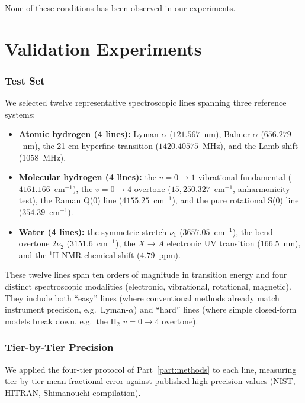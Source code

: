 \documentclass[11pt,a4paper]{article}
\theoremstyle{thmstyle}
\theoremstyle{axiomstyle}
\theoremstyle{definition}
\theoremstyle{remark}
\begin{document}
None of these conditions has been observed in our experiments.

\clearpage

\part{Validation Experiments}
\label{part:validation}

\section{Test Set}
\label{sec:testset}

We selected twelve representative spectroscopic lines spanning three reference systems:

\begin{itemize}[nosep]
\item \textbf{Atomic hydrogen (4 lines):} Lyman-$\alpha$ ($121.567$~nm), Balmer-$\alpha$ ($656.279$~nm), the 21 cm hyperfine transition ($1420.40575$~MHz), and the Lamb shift ($1058$~MHz).
\item \textbf{Molecular hydrogen (4 lines):} the $v=0\to 1$ vibrational fundamental ($4161.166$~cm$^{-1}$), the $v=0\to 4$ overtone ($15{,}250.327$~cm$^{-1}$, anharmonicity test), the Raman Q(0) line ($4155.25$~cm$^{-1}$), and the pure rotational S(0) line ($354.39$~cm$^{-1}$).
\item \textbf{Water (4 lines):} the symmetric stretch $\nu_{1}$ ($3657.05$~cm$^{-1}$), the bend overtone $2\nu_{2}$ ($3151.6$~cm$^{-1}$), the $X\to A$ electronic UV transition ($166.5$~nm), and the $^{1}$H NMR chemical shift ($4.79$~ppm).
\end{itemize}

These twelve lines span ten orders of magnitude in transition energy and four distinct spectroscopic modalities (electronic, vibrational, rotational, magnetic). They include both ``easy'' lines (where conventional methods already match instrument precision, e.g.\ Lyman-$\alpha$) and ``hard'' lines (where simple closed-form models break down, e.g.\ the H$_{2}$ $v=0\to 4$ overtone).

\section{Tier-by-Tier Precision}
\label{sec:tier_results}

We applied the four-tier protocol of Part~\ref{part:methods} to each line, measuring tier-by-tier mean fractional error against published high-precision values (NIST, HITRAN, Shimanouchi compilation).
\end{document}
